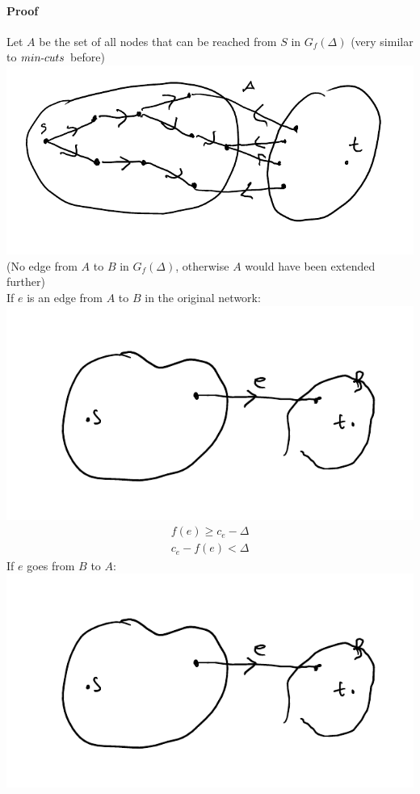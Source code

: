 \documentclass[12 pt]{article}
\begin{document}
        \paragraph{Proof} Let $A$ be the set of all nodes that can be
        reached from $S$ in $G_f(\Delta)$ (very similar to $min\hbox{-}cuts$
        before)
        \\ \includegraphics[width=.9\textwidth]{i40.pdf}
        \\ (No edge from $A$ to $B$ in $G_f(\Delta)$, otherwise $A$
        would have been extended further)
        \\ If $e$ is an edge from $A$ to $B$ in the original network:
        \\ \includegraphics[width=.9\textwidth]{i41.pdf}
        \begin{align*}
          f(e) \geq c_e - \Delta
          \\ c_e - f(e) < \Delta
        \end{align*}
        If $e$ goes from $B$ to $A$:
        \\\includegraphics[width=.9\textwidth]{i41.pdf}
\end{document}
